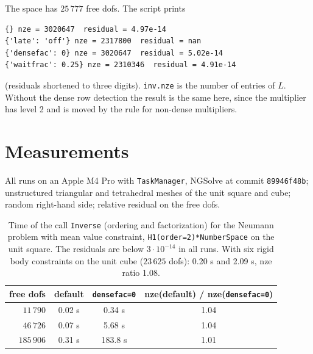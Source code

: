\documentclass[10pt,a4paper]{article}
\newcommand{\code}[1]{\texttt{#1}}
\begin{document}
The space has $25\,777$ free dofs. The script prints
\begin{lstlisting}[numbers=none,xleftmargin=0pt]
{} nze = 3020647  residual = 4.97e-14
{'late': 'off'} nze = 2317800  residual = nan
{'densefac': 0} nze = 3020647  residual = 5.02e-14
{'waitfrac': 0.25} nze = 2310346  residual = 4.91e-14
\end{lstlisting}
(residuals shortened to three digits). \code{inv.nze} is the number of entries of $L$. Without the dense row detection the result is the same here, since the multiplier has level 2 and is moved by the rule for non-dense multipliers.

\section{Measurements}

All runs on an Apple M4 Pro with \code{TaskManager}, NGSolve at commit \code{89946f48b}; unstructured triangular and tetrahedral meshes of the unit square and cube; random right-hand side; relative residual on the free dofs.

\begin{table}[h]\centering\small
\begin{tabular}{@{}r cc c@{}}\toprule
 free dofs & default & \code{densefac=0} & nze(default) / nze(\code{densefac=0})\\\midrule
 $11\,790$  & 0.02 s & 0.34 s  & 1.04\\
 $46\,726$  & 0.07 s & 5.68 s  & 1.04\\
 $185\,906$ & 0.31 s & 183.8 s & 1.01\\\bottomrule
\end{tabular}
\caption{Time of the call \code{Inverse} (ordering and factorization) for the Neumann problem with mean value constraint, \code{H1(order=2)*NumberSpace} on the unit square. The residuals are below $3\cdot10^{-14}$ in all runs. With six rigid body constraints on the unit cube ($23\,625$ dofs): 0.20 s and 2.09 s, nze ratio 1.08.}\label{tab:dense}
\end{table}
\end{document}

